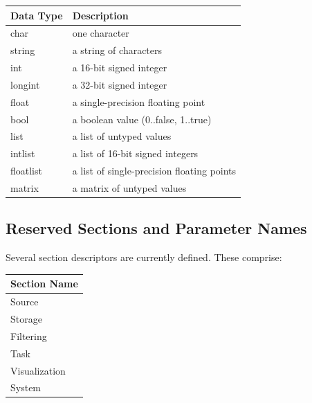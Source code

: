 \documentclass[letterpaper,oneside,12pt]{book}
\begin{document}
\begin{flushleft}

\begin{centering}
 \begin{tabular}{|l|l|}
  \hline
  \textbf{Data Type} & \textbf{Description} \\
  \hline
  char & one character \\
  \hline
  string & a string of characters \\
  \hline
  int & a 16-bit signed integer \\
  \hline
  longint & a 32-bit signed integer \\
  \hline
  float & a single-precision floating point \\
  \hline
  bool & a boolean value (0..false, 1..true) \\
  \hline
  list & a list of untyped values \\
  \hline
  intlist & a list of 16-bit signed integers \\
  \hline
  floatlist & a list of single-precision floating points \\
  \hline
  matrix & a matrix of untyped values \\
  \hline
 \end{tabular}
\end{centering}   

\vspace{.5cm}

\newpage

\subsection{Reserved Sections and Parameter Names}
Several section descriptors are currently defined. These comprise:

\begin{flushleft}
 \begin{tabular}{|l|}
  \hline
  \textbf{Section Name}\\
  \hline
  Source \\
  \hline
  Storage \\
  \hline
  Filtering \\
  \hline
  Task \\
  \hline
  Visualization \\
  \hline
  System \\
  \hline
 \end{tabular}
\end{flushleft}


\end{flushleft}
\end{document}
